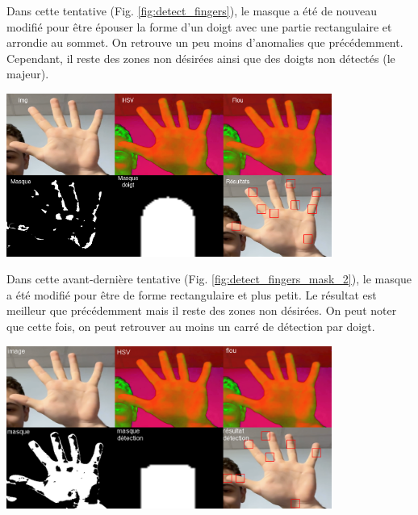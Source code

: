 \documentclass[11pt]{article}
\begin{document}
Dans cette tentative (Fig. \ref{fig:detect_fingers}), le masque a été de nouveau modifié pour être épouser la forme d'un doigt avec une partie rectangulaire et arrondie au sommet. On retrouve un peu moins d'anomalies que précédemment. Cependant, il reste des zones non désirées ainsi que des doigts non détectés (le majeur).
\begin{center}
    \includegraphics[width=0.8\textwidth]{images/detect_fingers.png}
    \label{fig:detect_fingers}
\end{center}
\bigbreak

Dans cette avant-dernière tentative (Fig. \ref{fig:detect_fingers_mask_2}), le masque a été modifié pour être de forme rectangulaire et plus petit. Le résultat est meilleur que précédemment mais il reste des zones non désirées. On peut noter que cette fois, on peut retrouver au moins un carré de détection par doigt.
\begin{center}
    \includegraphics[width=0.8\textwidth]{images/detect_fingers_mask_2.png}
    \label{fig:detect_fingers_mask_2}
\end{center}
\newpage
\end{document}
